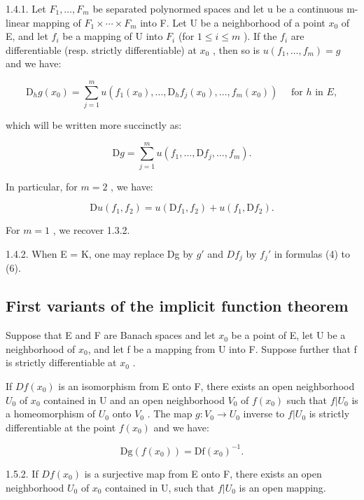 1.4.1. Let \(F_{1}, \ldots, F_{m}\) be separated polynormed spaces and let u be a continuous m-linear mapping of \(F_{1} \times \cdots \times F_{m}\) into F. Let U be a neighborhood of a point \(x_{0}\) of E, and let \(f_{i}\) be a mapping of U into \(F_{i}\) (for \(1 \leqslant i \leqslant m\) ). If the \(f_{i}\) are differentiable (resp. strictly differentiable) at \(x_{0}\) , then so is \(u(f_{1}, \ldots, f_{m}) = g\) and we have:

\[
\mathrm{D} _ {h} g (x _ {0}) = \sum_ {j = 1} ^ {m} u (f _ {1} (x _ {0}), \dots , \mathrm{D} _ {h} f _ {j} (x _ {0}), \dots , f _ {m} (x _ {0})) \quad \text { for } h \text { in } E, \tag {4}
\]

which will be written more succinctly as:

\[
\mathrm{D} g = \sum_ {j = 1} ^ {m} u (f _ {1}, \dots , \mathrm{D} f _ {j}, \dots , f _ {m}).\tag{5}
\]

In particular, for \(m = 2\) , we have:

\[
\mathrm{D} u (f _ {1}, f _ {2}) = u (\mathrm{D} f _ {1}, f _ {2}) + u (f _ {1}, \mathrm{D} f _ {2}).\tag{6}
\]

For \(m = 1\) , we recover 1.3.2.

1.4.2. When E = K, one may replace Dg by \(g'\) and \(Df_{j}\) by \(f_{j}'\) in formulas (4) to (6).

\subsection{First variants of the implicit function theorem}

Suppose that E and F are Banach spaces and let \(x_{0}\) be a point of E, let U be a neighborhood of \(x_{0}\), and let f be a mapping from U into F. Suppose further that f is strictly differentiable at \(x_{0}\) .

If \(Df(x_0)\) is an isomorphism from E onto F, there exists an open neighborhood \(U_0\) of \(x_0\) contained in U and an open neighborhood \(V_0\) of \(f(x_0)\) such that \(f|U_0\) is a homeomorphism of \(U_0\) onto \(V_0\) . The map \(g: V_0 \to U_0\) inverse to \(f|U_0\) is strictly differentiable at the point \(f(x_0)\) and we have:

\[
\mathrm{Dg} (f (x _ {0})) = \mathrm{Df} (x _ {0}) ^ {- 1}.
\]

1.5.2. If \(Df(x_{0})\) is a surjective map from E onto F, there exists an open neighborhood \(U_{0}\) of \(x_{0}\) contained in U, such that \(f|U_{0}\) is an open mapping.

